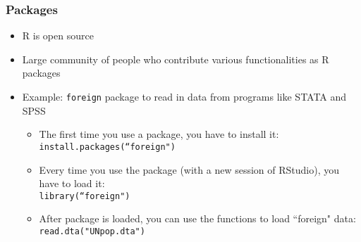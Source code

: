 \documentclass{beamer}
\begin{document}
\begin{frame}
 \frametitle<+->{Packages}
 \begin{itemize}
   \item R is open source
   \item Large community of people who contribute various functionalities as \alert{R packages}
   \item Example: {\tt foreign} package to read in data from programs like STATA and SPSS
     \begin{itemize}
		\item The first time you use a package, you have to install it:\\
		{\tt install.packages(``foreign")}
	    \item \alert{Every} time you use the package (with a new session of RStudio), you have to load it:\\
	    {\tt library(``foreign")}
	    \item After package is loaded, you can use the functions to load ``foreign" data:\\
	    {\tt read.dta("UNpop.dta")}
     \end{itemize}
 \end{itemize}
\end{frame}
\end{document}
